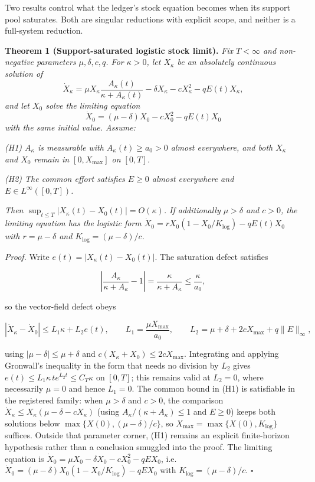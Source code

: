 \documentclass[11pt]{article}
\begin{document}
Two results control what the ledger's stock equation becomes when its support pool saturates. Both are singular reductions with explicit scope, and neither is a full-system reduction.

\textbf{Theorem 1 (Support-saturated logistic stock limit).} \emph{Fix \(T < \infty\) and non-negative parameters \(\mu, \delta, c, q\). For \(\kappa > 0\), let \(X_\kappa\) be an absolutely continuous solution of}
$$\dot X_\kappa=\mu X_\kappa\frac{A_\kappa(t)}{\kappa+A_\kappa(t)}-\delta X_\kappa-cX_\kappa^2-qE(t)X_\kappa,$$
\emph{and let \(X_0\) solve the limiting equation}
$$\dot X_0=(\mu-\delta)X_0-cX_0^2-qE(t)X_0$$
\emph{with the same initial value. Assume:}

\emph{(H1) \(A_\kappa\) is measurable with \(A_\kappa(t) \ge a_0 > 0\) almost everywhere, and both \(X_\kappa\) and \(X_0\) remain in \([0,X_{\max}]\) on \([0,T]\).}

\emph{(H2) The common effort satisfies \(E\ge0\) almost everywhere and \(E \in L^\infty([0,T])\).}

\emph{Then \(\sup_{t \le T} |X_\kappa(t) - X_0(t)| = O(\kappa)\). If additionally \(\mu > \delta\) and \(c > 0\), the limiting equation has the logistic form \(\dot X_0 = rX_0(1 - X_0/K_{\log}) - qE(t)X_0\) with \(r = \mu - \delta\) and \(K_{\log} = (\mu - \delta)/c\).}

\emph{Proof.} Write \(e(t) = |X_\kappa(t) - X_0(t)|\). The saturation defect satisfies 

$$\left| \frac{A_\kappa}{\kappa + A_\kappa} - 1 \right| = \frac{\kappa}{\kappa + A_\kappa} \le \frac{\kappa}{a_0},$$

 so the vector-field defect obeys 

$$|\dot X_\kappa - \dot X_0| \le L_1 \kappa + L_2 e(t), \qquad L_1 = \frac{\mu X_{\max}}{a_0}, \qquad L_2 = \mu + \delta + 2cX_{\max} + q\|E\|_\infty,$$

 using \(|\mu - \delta| \le \mu + \delta\) and \(c(X_\kappa + X_0) \le 2cX_{\max}\). Integrating and applying Gronwall's inequality in the form that needs no division by \(L_2\) gives \(e(t)\le L_1\kappa\,t e^{L_2t}\le C_T\kappa\) on \([0,T]\); this remains valid at \(L_2=0\), where necessarily \(\mu=0\) and hence \(L_1=0\). The common bound in (H1) is satisfiable in the registered family: when \(\mu>\delta\) and \(c>0\), the comparison \(\dot X_\kappa \le X_\kappa(\mu - \delta - cX_\kappa)\) (using \(A_\kappa/(\kappa+A_\kappa)\le1\) and \(E\ge0\)) keeps both solutions below \(\max\{X(0),(\mu-\delta)/c\}\), so \(X_{\max} = \max\{X(0), K_{\log}\}\) suffices. Outside that parameter corner, (H1) remains an explicit finite-horizon hypothesis rather than a conclusion smuggled into the proof. The limiting equation is \(\dot X_0 =\allowbreak{} \mu X_0 - \delta X_0 - cX_0^2 - qE X_0\), i.e. \(\dot X_0 =\allowbreak{} (\mu - \delta)X_0 (1 - X_0/\allowbreak{}K_{\log}) - qE X_0\) with \(K_{\log} = (\mu - \delta)/c\). \(\square\)
\end{document}

